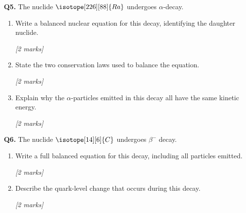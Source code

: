 \begin{tcolorbox}[colback=white, colframe=midblue, breakable]

\begin{minipage}{\linewidth}
\textbf{Q5.} The nuclide $\isotope[226][88]{Ra}$ undergoes $\alpha$-decay.
\end{minipage}

\begin{enumerate}[label=(\alph*)]
  \item \begin{minipage}[t]{\linewidth}
  Write a balanced nuclear equation for this decay, identifying the daughter nuclide.
  \par\hfill\textit{[2 marks]}
  \vspace{3cm}
  \end{minipage}

  \item \begin{minipage}[t]{\linewidth}
  State the two conservation laws used to balance the equation.
  \par\hfill\textit{[2 marks]}
  \vspace{2.5cm}
  \end{minipage}

  \item \begin{minipage}[t]{\linewidth}
  Explain why the $\alpha$-particles emitted in this decay all have the same kinetic energy.
  \par\hfill\textit{[2 marks]}
  \vspace{3cm}
  \end{minipage}
\end{enumerate}

\begin{minipage}{\linewidth}
\textbf{Q6.} The nuclide $\isotope[14][6]{C}$ undergoes $\beta^-$ decay.
\end{minipage}

\begin{enumerate}[label=(\alph*)]
  \item \begin{minipage}[t]{\linewidth}
  Write a full balanced equation for this decay, including all particles emitted.
  \par\hfill\textit{[2 marks]}
  \vspace{3cm}
  \end{minipage}

  \item \begin{minipage}[t]{\linewidth}
  Describe the quark-level change that occurs during this decay.
  \par\hfill\textit{[2 marks]}
  \vspace{3cm}
  \end{minipage}


\end{enumerate}
\end{tcolorbox}
